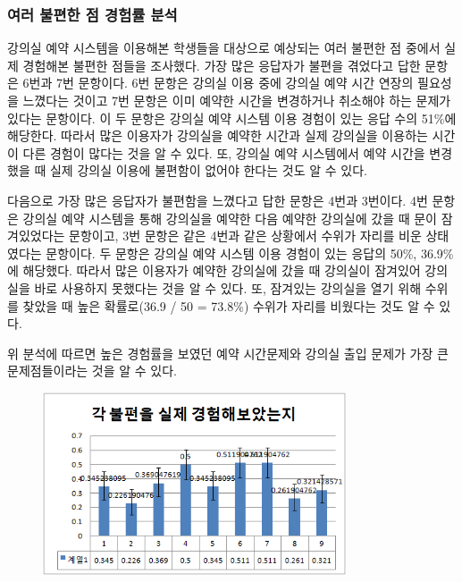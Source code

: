 \documentclass[11pt,a4paper]{article}
\begin{document}
\subsubsection{여러 불편한 점 경험률 분석}
강의실 예약 시스템을 이용해본 학생들을 대상으로 예상되는 여러 불편한 점 중에서
실제 경험해본 불편한 점들을 조사했다. 가장 많은 응답자가 불편을 겪었다고 답한
문항은 6번과 7번 문항이다. 6번 문항은 강의실 이용 중에 강의실 예약 시간 연장의
필요성을 느꼈다는 것이고 7번 문항은 이미 예약한 시간을 변경하거나 취소해야 하는
문제가 있다는 문항이다. 이 두 문항은 강의실 예약 시스템 이용 경험이 있는 응답
수의 51\%에 해당한다. 따라서 많은 이용자가 강의실을 예약한 시간과 실제 강의실을
이용하는 시간이 다른 경험이 많다는 것을 알 수 있다. 또, 강의실 예약 시스템에서
예약 시간을 변경했을 때 실제 강의실 이용에 불편함이 없어야 한다는 것도 알 수
있다.

다음으로 가장 많은 응답자가 불편함을 느꼈다고 답한 문항은 4번과 3번이다. 4번
문항은 강의실 예약 시스템을 통해 강의실을 예약한 다음 예약한 강의실에 갔을 때
문이 잠겨있었다는 문항이고, 3번 문항은 같은 4번과 같은 상황에서 수위가 자리를
비운 상태였다는 문항이다. 두 문항은 강의실 예약 시스템 이용 경험이 있는 응답의
50\%, 36.9\%에 해당했다. 따라서 많은 이용자가 예약한 강의실에 갔을 때 강의실이
잠겨있어 강의실을 바로 사용하지 못했다는 것을 알 수 있다. 또, 잠겨있는 강의실을
열기 위해 수위를 찾았을 때 높은 확률로(36.9 / 50 = 73.8\%) 수위가 자리를
비웠다는 것도 알 수 있다.

위 분석에 따르면 높은 경험률을 보였던 예약 시간문제와 강의실 출입 문제가 가장 큰 문제점들이라는 것을 알 수 있다.
\begin{figure}[h]
\includegraphics[width=0.8\textwidth]{4_1_2}
\centering
\end{figure}
\end{document}
